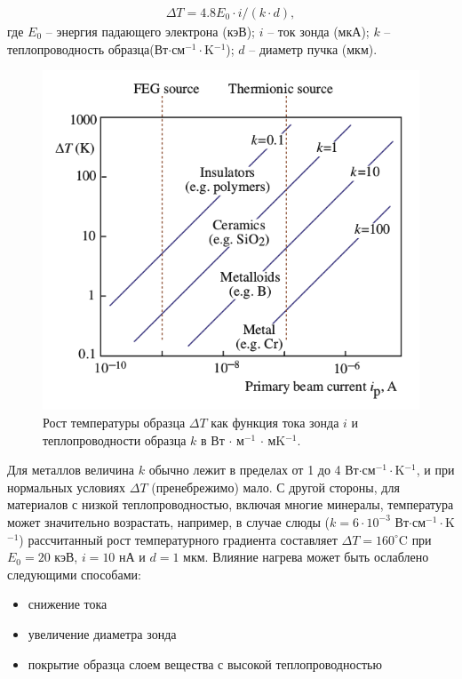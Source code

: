 \documentclass[12pt]{article}
\newcommand{\lb}{\left(}
\newcommand{\rb}{\right)}
\begin{document}
\begin{gather}
		\Delta T = 4.8 E_0 \cdot i / \lb k \cdot d \rb, 
\end{gather}
где $E_0$ -- энергия падающего электрона (кэВ); $i$ -- ток зонда (мкА); $k$ -- теплопроводность образца(Вт$\cdot$см$^{-1}\cdot$K$^{-1}$); $d$ -- диаметр пучка (мкм). 

\begin{figure}[!ht]
\centering
\includegraphics[scale = 0.7]{pictures/delta_t.png}
\caption{Рост температуры образца $\Delta T$ как функция тока зонда $i$ и теплопроводности образца $k$ в Вт $\cdot$ м$^{-1}$ $\cdot$ мK$^{-1}$.}
\label{tungsten-cathode}
\end{figure}

Для металлов величина $k$ обычно лежит в пределах от 1 до 4 Вт$\cdot$см$^{-1}\cdot$K$^{-1}$, и при нормальных условиях $\Delta T$ (пренебрежимо) мало. С другой стороны, для материалов с низкой теплопроводностью, включая многие минералы, температура может значительно возрастать, например, в случае слюды ($k = 6 \cdot 10^{-3}$ Вт$\cdot$см$^{-1}\cdot$K$^{-1}$) рассчитанный рост температурного градиента составляет $\Delta T = 160^\circ$C при $E_0 = 20$ кэВ, $i = 10$ нА и $d = 1$ мкм. Влияние нагрева может быть ослаблено следующими способами:
\begin{itemize}
		\item снижение тока 
		\item увеличение диаметра зонда 
		\item покрытие образца слоем вещества с высокой теплопроводностью
\end{itemize}
\end{document}
